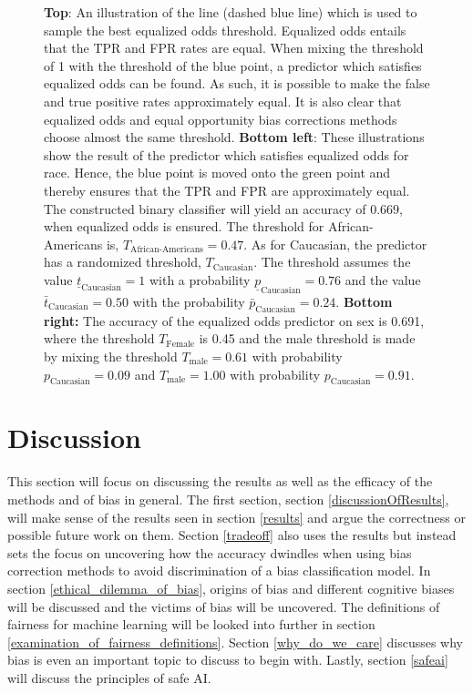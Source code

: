 \documentclass[11pt, fleqn, titlepage]{article}
\begin{document}
\begin{figure}[H]
		\caption{\textbf{Top}: An illustration of the line (dashed blue line) which is used to sample the best equalized odds threshold. Equalized odds entails that the TPR and FPR rates are equal. When mixing the threshold of 1 with the threshold of the blue point, a predictor which satisfies equalized odds can be found. As such, it is possible to make the false and true positive rates approximately equal. It is also clear that equalized odds and equal opportunity bias corrections methods choose almost the same threshold.  \textbf{Bottom left}: These illustrations show the result of the predictor which satisfies equalized odds for race. Hence, the blue point is moved onto the green point and thereby ensures that the TPR and FPR are approximately equal. The constructed binary classifier will yield an accuracy of $ 0.669 $, when equalized odds is ensured. The threshold for African-Americans is, $ T_{\text{African-Americans}} = 0.47 $. As for Caucasian, the predictor has a randomized threshold, $ T_{\text{Caucasian}} $. The threshold assumes the value $\underline t_{\text{Caucasian}} = 1 $  with a probability $ \underline p_{\text{Caucasian}}= 0.76 $ and the value $ \bar t_{\text{Caucasian}} = 0.50 $ with the probability $\bar p_{\text{Caucasian}} = 0.24 $. \textbf{Bottom right:} The accuracy of the equalized odds predictor on sex is 0.691, where the threshold $T_{\text{Female}}$ is 0.45 and the male threshold is made by mixing the threshold $T_{\text{male}} = 0.61$ with probability $p_{\text{Caucasian}} = 0.09$ and $T_{\text{male}} = 1.00$ with probability $p_{\text{Caucasian}} = 0.91$.}
		\label{fig:equalizedOdds}
	\end{figure}
	
	
	\section{Discussion} \label{discussion}	
	This section will focus on discussing the results as well as the efficacy of the methods and of bias in general. The first section, section \ref{discussionOfResults}, will make sense of the results seen in section \ref{results} and argue the correctness or possible future work on them. Section \ref{tradeoff} also uses the results but instead sets the focus on uncovering how the accuracy dwindles when using bias correction methods to avoid discrimination of a bias classification model. In section \ref{ethical_dilemma_of_bias}, origins of bias and different cognitive biases will be discussed and the victims of bias will be uncovered. The definitions of fairness for machine learning will be looked into further in section \ref{examination_of_fairness_definitions}. Section \ref{why_do_we_care} discusses why bias is even an important topic to discuss to begin with. Lastly, section \ref{safeai} will discuss the principles of safe AI.
	
\end{document}
